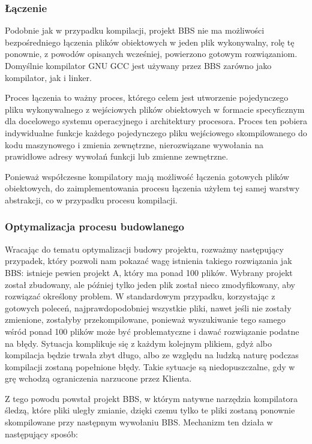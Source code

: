 \subsubsection{Łączenie}
Podobnie jak w przypadku kompilacji, projekt BBS nie ma możliwości bezpośredniego łączenia plików obiektowych w jeden plik wykonywalny, rolę tę ponownie, z powodów opisanych wcześniej, powierzono gotowym rozwiązaniom. Domyślnie kompilator GNU GCC jest używany przez BBS zarówno jako kompilator, jak i linker.

Proces łączenia to ważny proces, którego celem jest utworzenie pojedynczego pliku wykonywalnego z wejściowych plików obiektowych w formacie specyficznym dla docelowego systemu operacyjnego i architektury procesora. Proces ten pobiera indywidualne funkcje każdego pojedynczego pliku wejściowego skompilowanego do kodu maszynowego i zmienia zewnętrzne, nierozwiązane wywołania na prawidłowe adresy wywołań funkcji lub zmienne zewnętrzne.

Ponieważ współczesne kompilatory mają możliwość łączenia gotowych plików obiektowych, do zaimplementowania procesu łączenia użyłem tej samej warstwy abstrakcji, co w przypadku procesu kompilacji.

\subsubsection{Optymalizacja procesu budowlanego}
Wracając do tematu optymalizacji budowy projektu, rozważmy następujący przypadek, który pozwoli nam pokazać wagę istnienia takiego rozwiązania jak BBS: istnieje pewien projekt A, który ma ponad 100 plików. Wybrany projekt został zbudowany, ale później tylko jeden plik został nieco zmodyfikowany, aby rozwiązać określony problem. W standardowym przypadku, korzystając z gotowych poleceń, najprawdopodobniej wszystkie pliki, nawet jeśli nie zostały zmienione, zostałyby przekompilowane, ponieważ wyszukiwanie tego samego wśród ponad 100 plików może być problematyczne i dawać rozwiązanie podatne na błędy. Sytuacja komplikuje się z każdym kolejnym plikiem, gdyż albo kompilacja będzie trwała zbyt długo, albo ze względu na ludzką naturę podczas kompilacji zostaną popełnione błędy. Takie sytuacje są niedopuszczalne, gdy w grę wchodzą ograniczenia narzucone przez Klienta.

Z tego powodu powstał projekt BBS, w którym natywne narzędzia kompilatora śledzą, które pliki uległy zmianie, dzięki czemu tylko te pliki zostaną ponownie skompilowane przy następnym wywołaniu BBS. Mechanizm ten działa w następujący sposób:


